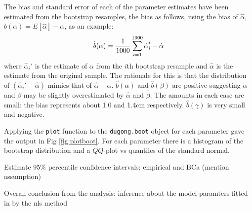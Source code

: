 The bias and standard error of each of the parameter estimates have been
estimated from the bootstrap resamples, the bias as follows, using the
bias of $\hat\alpha$, $b(\alpha)=E[\hat\alpha]-\alpha$, as an example:
\begin{equation*}
  \hat{b}(\alpha)= \frac{1}{1000}\sum_{i=1}^{1000}\hat\alpha_i' - \hat\alpha  \\
\end{equation*}
where $\hat\alpha_i'$ is the estimate of $\alpha$ from the $i$th bootstrap
resample and $\hat\alpha$ is the estimate from the original
sample. The rationale for this is that the distribution of
$(\hat\alpha_i'-\hat\alpha)$ mimics that of
$\hat\alpha-\alpha$. $\hat{b}(\alpha)$ and $\hat{b}(\beta)$ are
positive suggesting $\alpha$ and $\beta$ may be slightly overestimated
by $\hat\alpha$ and $\hat\beta$. The amounts in each case are small:
the bias represents about 1.0 and 1.4cm
respectively. $\hat{b}(\gamma)$ is very small and negative.

Applying the \texttt{plot} function to the \texttt{dugong.boot} object
for each parameter gave the output in Fig \ref{fig:plotboot}. For each
parameter there is a histogram of the bootstrap distribution and a
$QQ$-plot vs quantiles of the standard normal.

Estimate 95\% percentile confidence intervals: empirical and BCa (mention assumption)

Overall conclusion from the analysis: inference about the model paramters
fitted in by the nls method

 


